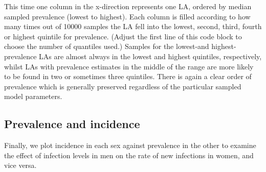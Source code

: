 \documentclass{article}
\begin{document}
    This time one column in the x-direction represents one LA, ordered by
median sampled prevalence (lowest to highest). Each column is filled
according to how many times out of 10000 samples the LA fell into the
lowest, second, third, fourth or highest quintile for prevalence.
(Adjust the first line of this code block to choose the number of
quantiles used.) Samples for the lowest-and highest-prevalence LAs are
almost always in the lowest and highest quintiles, respectively, whilst
LAs with prevalence estimates in the middle of the range are more likely
to be found in two or sometimes three quintiles. There is again a clear
order of prevalence which is generally preserved regardless of the
particular sampled model parameters.

    \subsection{Prevalence and incidence}\label{prevalence-and-incidence}

Finally, we plot incidence in each sex against prevalence in the other
to examine the effect of infection levels in men on the rate of new
infections in women, and vice versa.
\end{document}
